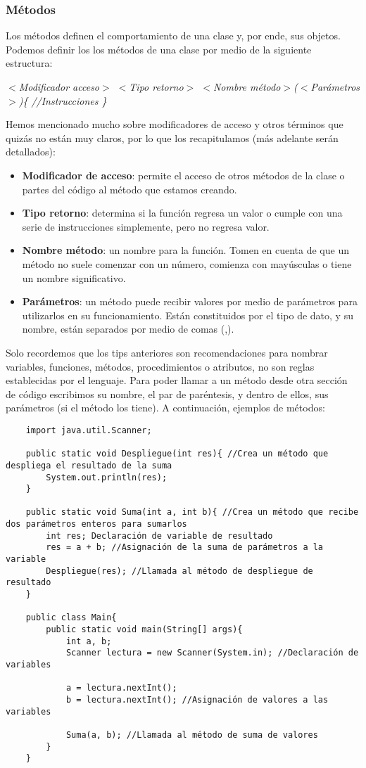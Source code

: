 \subsubsection{Métodos}
Los métodos definen el comportamiento de una clase y, por ende, sus objetos. Podemos definir los los métodos de una clase por medio de la siguiente estructura:\begin{center}\textit{$<$Modificador acceso$>$ $<$Tipo retorno$>$ $<$Nombre método$>$($<$Parámetros$>$)\{ //Instrucciones \}}\end{center}
Hemos mencionado mucho sobre modificadores de acceso y otros términos que quizás no están muy claros, por lo que los recapitulamos (más adelante serán detallados):
\begin{itemize}
    \item \textbf{Modificador de acceso}: permite el acceso de otros métodos de la clase o partes del código al método que estamos creando.
    \item \textbf{Tipo retorno}: determina si la función regresa un valor o cumple con una serie de instrucciones simplemente, pero no regresa valor.
    \item \textbf{Nombre método}: un nombre para la función. Tomen en cuenta de que un método no suele comenzar con un número, comienza con mayúsculas o tiene un nombre significativo.
    \item \textbf{Parámetros}: un método puede recibir valores por medio de parámetros para utilizarlos en su funcionamiento. Están constituidos por el tipo de dato, y su nombre, están separados por medio de comas (,).
\end{itemize}
Solo recordemos que los tips anteriores son recomendaciones para nombrar variables, funciones, métodos, procedimientos o atributos, no son reglas establecidas por el lenguaje. Para poder llamar a un método desde otra sección de código escribimos su nombre, el par de paréntesis, y dentro de ellos, sus parámetros (si el método los tiene). A continuación, ejemplos de métodos:
\begin{lstlisting}
    import java.util.Scanner;
    
    public static void Despliegue(int res){ //Crea un método que despliega el resultado de la suma
        System.out.println(res);
    }
    
    public static void Suma(int a, int b){ //Crea un método que recibe dos parámetros enteros para sumarlos
        int res; Declaración de variable de resultado
        res = a + b; //Asignación de la suma de parámetros a la variable
        Despliegue(res); //Llamada al método de despliegue de resultado
    }
    
    public class Main{
        public static void main(String[] args){
            int a, b;
            Scanner lectura = new Scanner(System.in); //Declaración de variables
            
            a = lectura.nextInt();
            b = lectura.nextInt(); //Asignación de valores a las variables
            
            Suma(a, b); //Llamada al método de suma de valores
        }
    }
\end{lstlisting}
